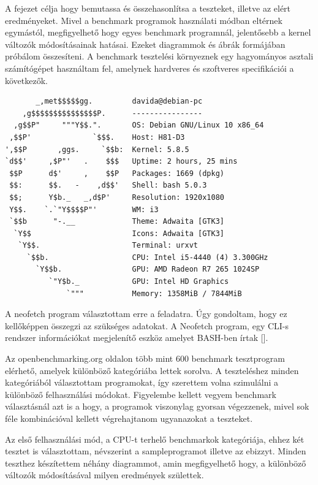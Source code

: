 
A fejezet célja hogy bemutassa és összehasonlítsa a teszteket, illetve az elért eredményeket. Mivel a benchmark programok használati módban eltérnek egymástól, megfigyelhető hogy egyes benchmark programnál, jelentősebb a kernel változók módosításainak hatásai.
Ezeket diagrammok és ábrák formájában próbálom összesíteni.
A benchmark tesztelési környeznek egy hagyományos asztali számítógépet használtam fel, amelynek hardveres és szoftveres specifikációi a következők.

\begin{lstlisting}
       _,met$$$$$gg.         davida@debian-pc 
    ,g$$$$$$$$$$$$$$$P.      ---------------- 
  ,g$$P"     """Y$$.".       OS: Debian GNU/Linux 10 x86_64 
 ,$$P'              `$$$.    Host: H81-D3 
',$$P       ,ggs.     `$$b:  Kernel: 5.8.5 
`d$$'     ,$P"'   .    $$$   Uptime: 2 hours, 25 mins 
 $$P      d$'     ,    $$P   Packages: 1669 (dpkg) 
 $$:      $$.   -    ,d$$'   Shell: bash 5.0.3 
 $$;      Y$b._   _,d$P'     Resolution: 1920x1080 
 Y$$.    `.`"Y$$$$P"'        WM: i3 
 `$$b      "-.__             Theme: Adwaita [GTK3] 
  `Y$$                       Icons: Adwaita [GTK3] 
   `Y$$.                     Terminal: urxvt 
     `$$b.                   CPU: Intel i5-4440 (4) 3.300GHz 
       `Y$$b.                GPU: AMD Radeon R7 265 1024SP 
          `"Y$b._            GPU: Intel HD Graphics 
              `"""           Memory: 1358MiB / 7844MiB
\end{lstlisting}
A neofetch program választottam erre a feladatra. Úgy gondoltam, hogy ez kellőképpen összegzi az szükséges adatokat. A Neofetch program, egy CLI-s rendszer információkat megjelenítő eszköz amelyet BASH-ben írtak [].



Az openbenchmarking.org oldalon több mint 600 benchmark tesztprogram elérhető, amelyek különböző kategóriába lettek sorolva. A teszteléshez minden kategóriából választottam programokat, így szerettem volna szimulálni a különböző felhasználási módokat. Figyelembe kellett vegyem benchmark választásnál azt is a hogy, a programok viszonylag gyorsan végezzenek, mivel sok féle kombinációval kellett végrehajtanom ugyanazokat a teszteket. 


Az első felhasználási mód, a CPU-t terhelő benchmarkok kategóriája, ehhez két tesztet is választottam, névszerint a sampleprogramot illetve az ebizzyt.
Minden teszthez készítettem néhány diagrammot, amin megfigyelhető hogy, a különböző változók módosításával milyen eredmények születtek.

